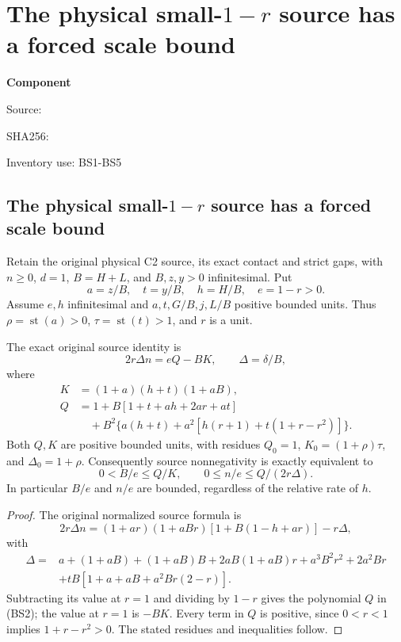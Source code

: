 \chapter{The physical small-$1-r$ source has a forced scale bound}
\label{component:p0c68f3aecc59}
\noindent\textbf{Component }\par
{\small\noindent Source: \par}
{\small\noindent SHA256: \par}
{\small\noindent Inventory use: BS1-BS5\par}
\medskip
\section{The physical small-$1-r$ source has a forced scale bound}
\label{p0c68f3aecc59:sec:r12-small-gap-scale}

Retain the original physical C2 source, its exact contact and strict
gaps, with $n\ge0$, $d=1$, $B=H+L$, and $B,z,y>0$
infinitesimal. Put
\[
 a=z/B,\quad t=y/B,\quad h=H/B,\quad e=1-r>0.
\]
Assume $e,h$ infinitesimal and $a,t,G/B,j,L/B$ positive bounded
units. Thus $\rho=\operatorname{st}(a)>0$,
$\tau=\operatorname{st}(t)>1$, and $r$ is a unit.

\begin{lemma}
The exact original source identity is
\[
 2r\Delta n=eQ-BK,\qquad \Delta=\delta/B,             \tag{BS1}
\]
where
\[
\begin{split}
 K&=(1+a)(h+t)(1+aB),\\
 Q&=1+B[1+t+ah+2ar+at]\\
  &\quad+B^2\{a(h+t)+a^2[h(r+1)+t(1+r-r^2)]\}.
\end{split}                                            \tag{BS2}
\]
Both $Q,K$ are positive bounded units, with residues
$Q_0=1$, $K_0=(1+\rho)\tau$, and $\Delta_0=1+\rho$.
Consequently source nonnegativity is exactly equivalent to
\[
 0<B/e\le Q/K,\qquad
 0\le n/e\le Q/(2r\Delta).                            \tag{BS3}
\]
In particular $B/e$ and $n/e$ are bounded, regardless of the
relative rate of $h$.
\end{lemma}
\begin{proof}
The original normalized source formula is
\[
 2r\Delta n=(1+ar)(1+aBr)[1+B(1-h+ar)]-r\Delta,
\]
with
\[
\begin{split}
 \Delta={}&a+(1+aB)+(1+aB)B+2aB(1+aB)r+a^3B^2r^2
       +2a^2Br\\
       &+tB[1+a+aB+a^2Br(2-r)].
\end{split}
\]
Subtracting its value at $r=1$ and dividing by $1-r$ gives
the polynomial $Q$ in (BS2); the value at $r=1$ is $-BK$.
Every term in $Q$ is positive, since $0<r<1$ implies
$1+r-r^2>0$. The stated residues and inequalities follow.
\end{proof}

